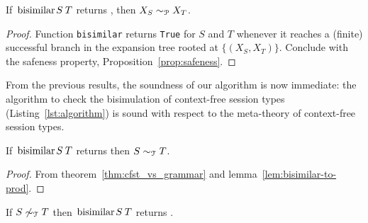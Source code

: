 
\begin{lemma}
  \label{lem:bisimilar-to-prod}
  If $\bisimf S T$ returns , then
  $X_{S} \sim_\mathcal P X_{T}$.
\end{lemma}

\begin{proof}
  Function \lstinline|bisimilar| returns \lstinline|True| for $S$ and
  $T$ whenever it reaches a (finite) successful branch in the expansion
  tree rooted at $\{(X_{S}, X_{T})\}$. Conclude with the safeness property,
  Proposition~\ref{prop:safeness}.
\end{proof}

From the previous results, the soundness of our algorithm is now
immediate: the algorithm to check the bisimulation of context-free
session types (Listing~\ref{lst:algorithm}) is sound with respect to
the meta-theory of context-free session types.

\begin{theorem}
\label{thm:soundness}
  If $\bisimf ST$ returns  then $S\sim_\mathcal T T$.
\end{theorem}

\begin{proof}
  From theorem~\ref{thm:cfst_vs_grammar} and
  lemma~\ref{lem:bisimilar-to-prod}.
\end{proof}

\begin{corollary}
	If $S\not\sim_\mathcal T T$ then $\bisimf ST$ returns .
\end{corollary}

